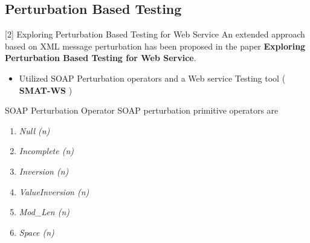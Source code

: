 \documentclass[10pt]{beamer}
\begin{document}
\subsection{Perturbation Based Testing}
\begin{frame}{[2] Exploring Perturbation Based Testing for Web Service}
	An extended approach based on XML message perturbation has been proposed 
	in the paper \textbf{Exploring Perturbation Based Testing for Web Service}.
	\begin{itemize}
		\item  Utilized SOAP Perturbation operators and a Web service Testing tool (\textbf{ SMAT-WS })
	\end{itemize}
	 
  \begin{block}{SOAP Perturbation Operator}
    SOAP perturbation primitive operators are
    \begin{enumerate}
    \item  \textit{Null (n)}
    \item \textit{Incomplete (n)}
    \item \textit{Inversion (n)}
    \item \textit{ValueInversion (n)}
    \item \textit{Mod\_Len (n)}
    \item \textit{Space (n)}
    
    \end{enumerate}   
  \end{block}
\end{frame}
\end{document}
